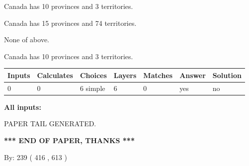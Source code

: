 \documentclass[12pt]{article}
\begin{document}
 
Canada has 10  provinces and 3 territories.
 
 
Canada has  15 provinces and  74 territories.
 
 
 None of above.
 
 
\noindent{}
 
 
Canada has 10  provinces and 3 territories.
 
 
\noindent{}
 
 
   
   
   
   
\noindent\begin{tabular}{|l|l|l|l|l|l|l|}
 \hline
Inputs & Calculates & Choices & Layers & Matches & Answer & Solution \\ \hline
 0  & 
 0  & 
 6
  simple  
  & 
 6  & 
 0  & 
  yes & 
  no 
  \\ \hline
 \end{tabular}
   
   
   
   
\noindent{}
   
   
   
   
\noindent\vspace{0.1in}\hspace{-0.08in} {\textbf{\Large{All inputs: }}}
   
   
   
   
   
   
 \vspace{0.2in}
 
   
   
\vspace{2.0in} PAPER TAIL GENERATED.
   
   
   
   
\vspace{1.0in} 
{\textbf{\large{ *** END OF PAPER, THANKS *** }}} 
   
   
\hspace{1.0in} By: 
 239 ( 416 ,  613 )
   
   
   
   
\newpage 
\setcounter{page}{ 
   501001 } 
   
   
   
\end{document}
